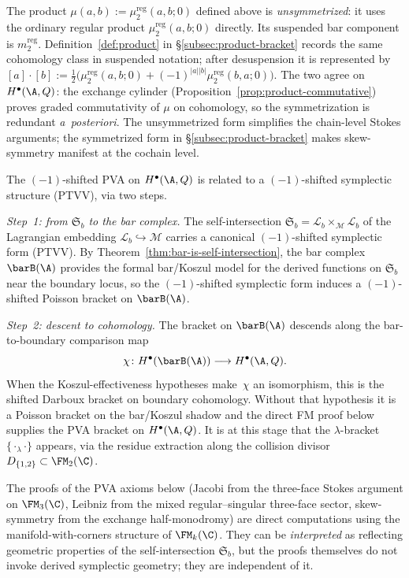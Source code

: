 \begin{remark}
\label{rem:unsymmetrized-product}
The product $\mu(a,b) := \mu_2^{\mathrm{reg}}(a,b;0)$ defined above is
\emph{unsymmetrized}: it uses the ordinary regular product
$\mu_2^{\mathrm{reg}}(a,b;0)$ directly. Its suspended bar component is
$m_2^{\mathrm{reg}}$.  Definition~\ref{def:product} in
\S\ref{subsec:product-bracket} records the same cohomology class in
suspended notation; after desuspension it is represented by
$[a]\cdot[b] := \tfrac{1}{2}\bigl(\mu_2^{\mathrm{reg}}(a,b;0) +
(-1)^{|a||b|}\mu_2^{\mathrm{reg}}(b,a;0)\bigr)$.
The two agree on $H^\bullet(\A,Q)$: the exchange cylinder
(Proposition~\ref{prop:product-commutative}) proves graded commutativity of
$\mu$ on cohomology, so the symmetrization is redundant \emph{a~posteriori}.
The unsymmetrized form simplifies the chain-level
Stokes arguments; the symmetrized form in \S\ref{subsec:product-bracket}
makes skew-symmetry manifest at the cochain level.
\end{remark}

\begin{remark}
\label{rem:symplectic-origin-PVA}
The $(-1)$-shifted PVA on $H^\bullet(\A,Q)$ is
related to a $(-1)$-shifted symplectic structure (PTVV), via two steps.

\smallskip\noindent\emph{Step~1: from $\mathfrak{S}_b$ to the bar complex.}
The self-intersection
$\mathfrak{S}_b = \mathscr{L}_b \times_{\mathscr{M}} \mathscr{L}_b$ of the
Lagrangian embedding $\mathscr{L}_b \hookrightarrow \mathscr{M}$ carries a
canonical $(-1)$-shifted symplectic form (PTVV).
By Theorem~\ref{thm:bar-is-self-intersection}, the bar complex
$\barB(\A)$ provides the formal bar/Koszul model for the derived
functions on $\mathfrak{S}_b$ near the boundary locus, so the
$(-1)$-shifted symplectic form induces a $(-1)$-shifted Poisson
bracket on $\barB(\A)$.

\smallskip\noindent\emph{Step~2: descent to cohomology.}
The bracket on $\barB(\A)$ descends along the bar-to-boundary
comparison map
\[
\chi\colon H^\bullet(\barB(\A))\longrightarrow H^\bullet(\A,Q).
\]
When the Koszul-effectiveness hypotheses make~$\chi$ an isomorphism,
this is the shifted Darboux bracket on boundary cohomology. Without
that hypothesis it is a Poisson bracket on the bar/Koszul shadow and
the direct FM proof below supplies the PVA bracket on
$H^\bullet(\A,Q)$. It is at this stage that the $\lambda$-bracket
$\{{\cdot}_\lambda{\cdot}\}$ appears, via the residue extraction
along the collision divisor $D_{\{1,2\}} \subset \FM_2(\C)$.

\smallskip
The proofs of the PVA axioms below (Jacobi from the three-face
Stokes argument on $\FM_3(\C)$, Leibniz from the mixed
regular--singular three-face sector, skew-symmetry from the exchange
half-monodromy) are direct
computations using the manifold-with-corners structure of
$\FM_k(\C)$. They can be \emph{interpreted} as reflecting
geometric properties of the self-intersection $\mathfrak{S}_b$,
but the proofs themselves do not invoke derived symplectic
geometry; they are independent of it.
\end{remark}

